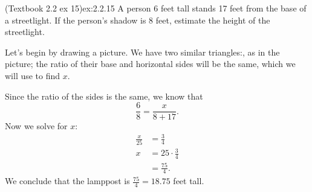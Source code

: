 \documentclass{article}
\begin{document}
\begin{example}{(Textbook 2.2 ex 15)}{ex:2.2.15}
    A person 6 feet tall stands 17 feet from the base of a streetlight. If the person's shadow is 8 feet, estimate the height of the streetlight.
\end{example}
\begin{solution}
    \begin{minipage}{.36\textwidth}
    \end{minipage}
    \begin{minipage}{.63\textwidth}
        Let's begin by drawing a picture. We have two similar triangles:, as in the picture; the ratio of their base and horizontal sides will be the same, which we will use to find $x$.

        Since the ratio of the sides is the same, we know that \[\frac{6}{8}=\frac{x}{8+17}.\] Now we solve for $x$:
        \begin{align*}
            \frac{x}{25}&=\frac{3}{4}\\
            x&=25\cdot\frac{3}{4}\\
            &=\frac{75}{4}.
        \end{align*}
        We conclude that the lamppost is $\frac{75}{4}=18.75$ feet tall.
    \end{minipage}
\end{solution}
\end{document}
